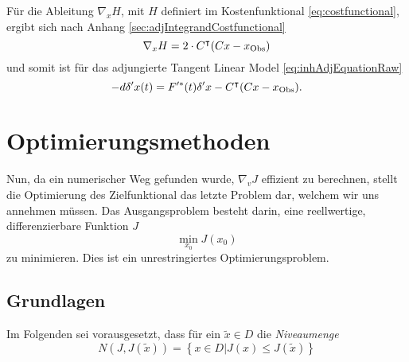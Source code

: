 Für die Ableitung $\nabla_x H$, mit $H$ definiert im Kostenfunktional \eqref{eq:costfunctional}, ergibt sich nach Anhang \ref{sec:adjIntegrandCostfunctional}
\[
 \nabla_x H = 2\cdot C^\intercal (Cx - x_{\text{Obs}})
\]
und somit ist für das adjungierte Tangent Linear Model \eqref{eq:inhAdjEquationRaw}
\begin{equation}
\label{eq:inhAdjEquation}
 -d\delta'x(t) = F'^*(t)\delta'x -  C^\intercal (Cx - x_{\text{Obs}}).
\end{equation}


% 

\section{Optimierungsmethoden}

Nun, da ein numerischer Weg gefunden wurde, $\nabla_v J$ effizient zu berechnen, stellt die Optimierung des Zielfunktional das letzte Problem dar, welchem wir uns annehmen müssen. Das Ausgangsproblem besteht darin, eine reellwertige, differenzierbare Funktion $J$
\begin{equation}
\label{eq:minProblem}
 \min_{x_0} J(x_0) 
\end{equation}
zu minimieren. Dies ist ein unrestringiertes Optimierungsproblem. 

\subsection{Grundlagen}
Im Folgenden sei vorausgesetzt, dass für ein $\tilde x\in D$ die \textit{Niveaumenge}
 \begin{equation}
 \label{eq:niveauset}
  N(J,J(\tilde x)) = \left\{ x\in D \vert J(x)\leq J(\tilde x)\right\}
 \end{equation}


